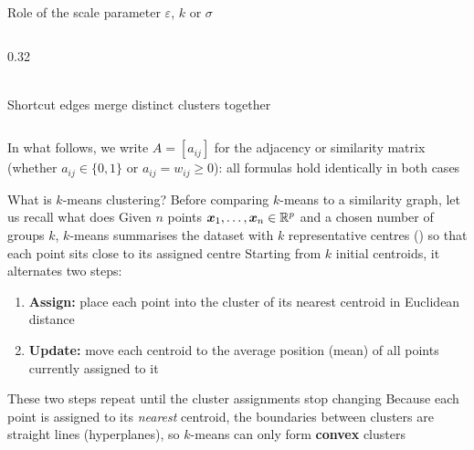 \documentclass[aspectratio=169]{beamer}\usepackage[]{graphicx}\usepackage[]{xcolor}
\begin{document}
\begin{frame}{Role of the scale parameter $\varepsilon$, $k$ or $\sigma$}
\begin{columns}[c]
\begin{column}{0.32\textwidth}
\\[4pt]
\footnotesize Shortcut edges merge distinct clusters together
\end{column}
\end{columns}
\vfill
In what follows, we write $A = [a_{ij}]$ for the adjacency or similarity matrix (whether $a_{ij} \in \{0, 1\}$ or $a_{ij} = w_{ij} \ge 0$): all formulas hold identically in both cases
\end{frame}


\begin{frame}{What is $k$-means clustering?}
Before comparing $k$-means to a similarity graph, let us recall what  does
\vfill
Given $n$ points $\bm{x}_1, \ldots, \bm{x}_n \in \mathbb{R}^p$ and a chosen number of groups $k$, $k$-means summarises the dataset with $k$ representative centres () so that each point sits close to its assigned centre
\vfill
Starting from $k$ initial centroids, it alternates two steps:
\begin{enumerate}
\item \textbf{Assign:} place each point into the cluster of its nearest centroid in Euclidean distance
\vfill
\item \textbf{Update:} move each centroid to the average position (mean) of all points currently assigned to it
\end{enumerate}
\vfill
These two steps repeat until the cluster assignments stop changing
\vfill
Because each point is assigned to its \emph{nearest} centroid, the boundaries between clusters are straight lines (hyperplanes), so $k$-means can only form \textbf{convex} clusters
\end{frame}
\end{document}
